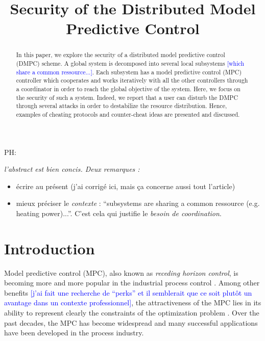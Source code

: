 \documentclass[conference]{IEEEtran}
\newcommand{\rem}[1]{\textcolor{blue}{[#1]}}
\begin{document}
%
\title{Security of the Distributed Model Predictive Control }


\author{
}

\maketitle
\thispagestyle{plain}
\pagestyle{plain}

\begin{abstract}
In this paper, we explore the security of a distributed model predictive control (DMPC) scheme. A global system is decomposed into several local subsystems \rem{which share a common ressource...}. Each subsystem has a model predictive control (MPC) controller which cooperates and works iteratively with all the other controllers through a coordinator in order to reach the global objective of the system. Here, we focus on the security of such a system. Indeed, we report that a user can disturb the DMPC through several attacks in order to destabilize the resource distribution. Hence, examples of cheating protocols and counter-cheat ideas are presented and discussed.
\end{abstract}


PH: {\itshape l'abstract est bien concis. Deux remarques :
\begin{itemize}
  \item écrire au présent (j'ai corrigé ici, mais ça concerne aussi tout l'article)
  \item mieux préciser le \emph{contexte} : ``subsystems are sharing a common ressource (e.g. heating power)...''. C'est cela qui justifie le \emph{besoin de coordination}.
\end{itemize}
}


\section{Introduction}
Model predictive control (MPC), also known as \textit{receding horizon control}, is becoming more and more popular in the industrial process control \cite{Venkat, Campo}. Among other benefits \rem{j'ai fait une recherche de ``perks'' et il semblerait que ce soit plutôt un avantage dans un contexte professionnel}, the attractiveness of the MPC lies in its ability to represent clearly the constraints of the optimization problem \cite{Jia}. Over the past decades, the MPC has become widespread and many successful applications have been developed in the process industry.
\end{document}
